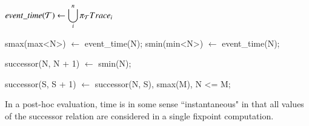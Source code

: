 $event\_time(\Tau) \leftarrow \displaystyle\bigcup_{i}^n \pi_{\Tau}Trace_{i}$

\begin{Dedalus}
smax(max<N>) \(\leftarrow\) event\_time(N);
smin(min<N>) \(\leftarrow\) event\_time(N);

successor(N, N + 1) \(\leftarrow\) smin(N);

successor(S, S + 1) \(\leftarrow\) 
    successor(N, S),
    smax(M),
    N <= M;
\end{Dedalus}

In a post-hoc evaluation, time is in some sense ``instantaneous" in that all values of the successor relation are considered in a single
fixpoint computation.  

